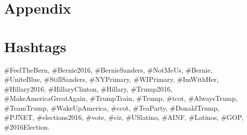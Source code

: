 \newpage
\section{Appendix}
\appendix
\section{Hashtags}
\label{appendix:hashtags}

\#FeelTheBern, \#Bernie2016, \#BernieSanders, \#NotMeUs, \#Bernie, \#UniteBlue,
\#StillSanders, \#NYPrimary, \#WIPrimary, \#ImWithHer, \#Hillary2016,
\#HillaryClinton, \#Hillary, \#Trump2016, \#MakeAmericaGreatAgain, \#TrumpTrain,
\#Trump, \#tcot, \#AlwaysTrump, \#TeamTrump, \#WakeUpAmerica, \#ccot,
\#TeaParty, \#DonaldTrump, \#PJNET, \#elections2016, \#vote, \#cir, \#USlatino,
\#AINF, \#Latinos, \#GOP, \#2016Election.
